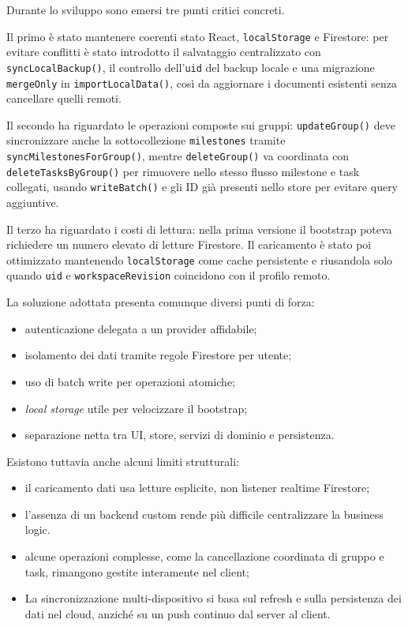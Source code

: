 \documentclass[11pt,a4paper]{article}
\begin{document}
\par Durante lo sviluppo sono emersi tre punti critici concreti.
\par Il primo è stato mantenere coerenti stato React, \texttt{localStorage} e Firestore: per evitare conflitti è stato introdotto il salvataggio centralizzato con \texttt{syncLocalBackup()}, il controllo dell'\texttt{uid} del backup locale e una migrazione \texttt{mergeOnly} in \texttt{importLocalData()}, così da aggiornare i documenti esistenti senza cancellare quelli remoti.
\par Il secondo ha riguardato le operazioni composte sui gruppi: \texttt{updateGroup()} deve sincronizzare anche la sottocollezione \texttt{milestones} tramite \texttt{syncMilestonesForGroup()}, mentre \texttt{deleteGroup()} va coordinata con \texttt{deleteTasksByGroup()} per rimuovere nello stesso flusso milestone e task collegati, usando \texttt{writeBatch()} e gli ID già presenti nello store per evitare query aggiuntive.
\par Il terzo ha riguardato i costi di lettura: nella prima versione il bootstrap poteva richiedere un numero elevato di letture Firestore. Il caricamento è stato poi ottimizzato mantenendo \texttt{localStorage} come cache persistente e riusandola solo quando \texttt{uid} e \texttt{workspaceRevision} coincidono con il profilo remoto.


\par La soluzione adottata presenta comunque diversi punti di forza:
\begin{itemize}
  \item autenticazione delegata a un provider affidabile;
  \item isolamento dei dati tramite regole Firestore per utente;
  \item uso di batch write per operazioni atomiche;
  \item \textit{local storage} utile per velocizzare il bootstrap;
  \item separazione netta tra UI, store, servizi di dominio e persistenza.
\end{itemize}

\par Esistono tuttavia anche alcuni limiti strutturali:
\begin{itemize}
  \item il caricamento dati usa letture esplicite, non listener realtime Firestore;
  \item l'assenza di un backend custom rende più difficile centralizzare la business logic.
  \item alcune operazioni complesse, come la cancellazione coordinata di gruppo e task, rimangono gestite interamente nel client;
  \item La sincronizzazione multi-dispositivo si basa sul refresh e sulla persistenza dei dati nel cloud, anziché su un push continuo dal server al client.
\end{itemize}
\end{document}
